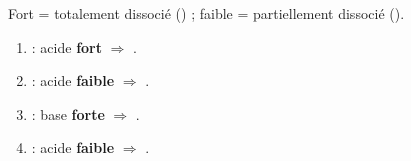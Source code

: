 \documentclass[11pt,a4paper]{article}
\begin{document}
\begin{corrige}
Fort = totalement dissocié (\ce{->}) ; faible = partiellement dissocié (\ce{<=>}).
\begin{enumerate}[label=\alph*)]
  \item {} : acide \textbf{fort} $\Rightarrow$ .
  \item {} : acide \textbf{faible} $\Rightarrow$ .
  \item {} : base \textbf{forte} $\Rightarrow$ .
  \item {} : acide \textbf{faible} $\Rightarrow$ .
\end{enumerate}
\end{corrige}
\end{document}
